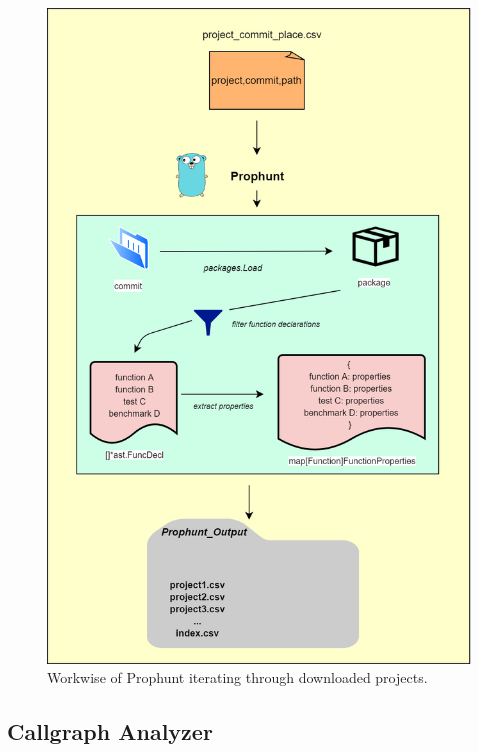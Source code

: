 \documentclass{seal_thesis}
\begin{document}
\begin{figure}[H]
	\centering
	\includegraphics[width=\linewidth]{prophunt}
	\caption{Workwise of Prophunt iterating through downloaded projects.}
	\label{fig:prophunt}
\end{figure}


\subsection{Callgraph Analyzer}
\label{Callgraph Analyzer}
\end{document}

